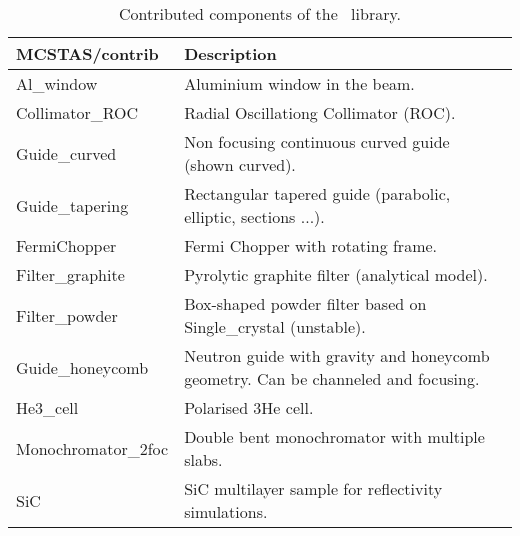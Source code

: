 \begin{table}
  \begin{center}
    {\let\my=\\
    \begin{tabular}{|p{}|p{}|}
      \hline
       {\bf MCSTAS/contrib} & Description \\
       \hline
       Al\_window     &         Aluminium
                        window in the beam. \\
 Collimator\_ROC   &      Radial
                        Oscillationg
                        Collimator (ROC). \\
 Guide\_curved     &     Non focusing continuous curved guide (shown curved). \\
 Guide\_tapering  &     Rectangular tapered guide (parabolic, elliptic, sections ...). \\

 FermiChopper    &       Fermi Chopper with
                        rotating frame. \\
 Filter\_graphite  &      Pyrolytic
                        graphite filter
                        (analytical model). \\
 Filter\_powder   &       Box-shaped powder
                        filter based on Single\_crystal (unstable). \\
 Guide\_honeycomb & Neutron guide
                        with gravity and
                        honeycomb geometry. Can be
                        channeled and
                        focusing. \\
 He3\_cell    &           Polarised 3He cell. \\

 Monochromator\_2foc   &  Double bent
                        monochromator with
                        multiple slabs. \\

 SiC           &         SiC multilayer sample for reflectivity simulations. \\
      \hline
    \end{tabular}
    \caption{Contributed components of the \MCS\ library.}
    \label{t:comp-contrib}
    }
  \end{center}
\end{table}

